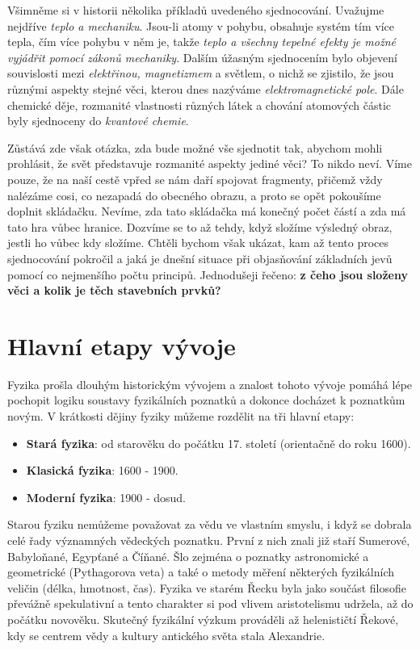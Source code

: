     Všimněme si v historii několika příkladů uvedeného sjednocování. Uvažujme nejdříve \emph{teplo 
    a mechaniku}. Jsou-li atomy v pohybu, obsahuje systém tím více tepla, čím více pohybu v něm je, 
    takže \emph{teplo a všechny tepelné efekty je možné vyjádřit pomocí zákonů mechaniky}. Dalším 
    úžasným sjednocením bylo objevení souvislosti mezi \emph{elektřinou, magnetizmem} a světlem, o 
    nichž se zjistilo, že jsou různými aspekty stejné věci, kterou dnes nazýváme 
    \emph{elektromagnetické pole}. Dále chemické děje, rozmanité vlastnosti různých látek a chování 
    atomových částic byly sjednoceny do \emph{kvantové chemie}.
    
    Zůstává zde však otázka, zda bude možné vše sjednotit tak, abychom mohli prohlásit, že svět 
    představuje rozmanité aspekty jediné věci? To nikdo neví. Víme pouze, že na naší cestě vpřed se 
    nám daří spojovat fragmenty, přičemž vždy nalézáme cosi, co nezapadá do obecného obrazu, a 
    proto se opět pokoušíme doplnit skládačku. Nevíme, zda tato skládačka má konečný počet částí a 
    zda má tato hra vůbec hranice. Dozvíme se to až tehdy, když složíme výsledný obraz, jestli ho 
    vůbec kdy složíme. Chtěli bychom však ukázat, kam až tento proces sjednocování pokročil a jaká 
    je dnešní situace při objasňování základních jevů pomocí co nejmenšího počtu principů. 
    Jednodušeji řečeno: \textbf{z čeho jsou složeny věci a kolik je těch stavebních prvků?} 
    \cite[s.~27]{Feynman02}
    
  \section{Hlavní etapy vývoje}\label{fyz:IchapIsecIII}
    Fyzika prošla dlouhým historickým vývojem a znalost tohoto vývoje pomáhá lépe pochopit logiku 
    soustavy fyzikálních poznatků a dokonce do\-cházet k poznatkům novým. V krátkosti dějiny 
    fyziky můžeme rozdělit na tři hlavní etapy:
    \begin{itemize}[noitemsep]
     	\item \textbf{Stará fyzika}: od starověku do počátku 17. století (orientačně do roku 1600).
      \item \textbf{Klasická fyzika}: 1600 - 1900.
      \item \textbf{Moderní fyzika}: 1900 - dosud.
    \end{itemize}
    Starou fyziku nemůžeme považovat za vědu ve vlastním smyslu, i když se dobrala celé řady 
    významných vědeckých poznatku. První z nich znali již staří Sumerové, Babyloňané, Egypťané a 
    Číňané. Šlo zejména o  poznatky astronomické a geometrické (Pythagorova veta) a také o metody 
    měření některých fyzikálních veličin (délka, hmotnost, čas). Fyzika ve starém Řecku byla jako 
    součást filosofie převážně spekulativní a tento charakter si pod vlivem aristotelismu udržela, 
    až do počátku novověku. Skutečný fyzikální výzkum prováděli až helenističtí Řekové, kdy se 
    centrem vědy a kultury antického světa stala Alexandrie. 
    
